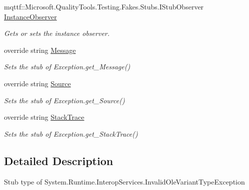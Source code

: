 \begin{DoxyCompactItemize}
mqttf\-::\-Microsoft.\-Quality\-Tools.\-Testing.\-Fakes.\-Stubs.\-I\-Stub\-Observer \hyperlink{class_system_1_1_runtime_1_1_interop_services_1_1_fakes_1_1_stub_invalid_ole_variant_type_exception_adbc2a0a259b068c850c04e36c12da7bb}{Instance\-Observer}
\begin{DoxyCompactList}\small\item\em Gets or sets the instance observer.\end{DoxyCompactList}\item 
override string \hyperlink{class_system_1_1_runtime_1_1_interop_services_1_1_fakes_1_1_stub_invalid_ole_variant_type_exception_ab25c20c2be3c1f8d7e8ace9e3e5c3610}{Message}
\begin{DoxyCompactList}\small\item\em Sets the stub of Exception.\-get\-\_\-\-Message()\end{DoxyCompactList}\item 
override string \hyperlink{class_system_1_1_runtime_1_1_interop_services_1_1_fakes_1_1_stub_invalid_ole_variant_type_exception_a141c0cdabd3e04c0157f65db3cf1c6d7}{Source}
\begin{DoxyCompactList}\small\item\em Sets the stub of Exception.\-get\-\_\-\-Source()\end{DoxyCompactList}\item 
override string \hyperlink{class_system_1_1_runtime_1_1_interop_services_1_1_fakes_1_1_stub_invalid_ole_variant_type_exception_ae39167b1b327867da4ab2be730fa4d02}{Stack\-Trace}
\begin{DoxyCompactList}\small\item\em Sets the stub of Exception.\-get\-\_\-\-Stack\-Trace()\end{DoxyCompactList}\end{DoxyCompactItemize}


\subsection{Detailed Description}
Stub type of System.\-Runtime.\-Interop\-Services.\-Invalid\-Ole\-Variant\-Type\-Exception



